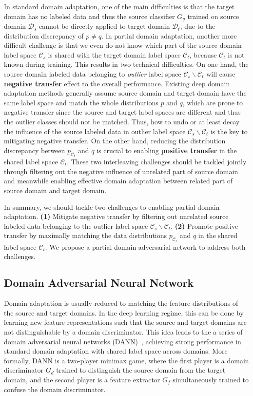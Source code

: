 \documentclass[runningheads]{llncs}
\begin{document}
In standard domain adaptation, one of the main difficulties is that the target domain has no labeled data and thus the source classifier $G_y$ trained on source domain $\mathcal{D}_s$ cannot be directly applied to target domain $\mathcal{D}_t$, due to the distribution discrepancy of $p \ne q$. In partial domain adaptation, another more difficult challenge is that we even do not know which part of the source domain label space $\mathcal{C}_s$ is shared with the target domain label space $\mathcal{C}_t$, because $\mathcal{C}_t$ is not known during training. This results in two technical difficulties.
On one hand, the source domain labeled data belonging to \emph{outlier} label space $\mathcal{C}_s \backslash \mathcal{C}_t$ will cause \textbf{negative transfer} effect to the overall performance. 
Existing deep domain adaptation methods \cite{cite:ICML15DAN,cite:ICML15RevGrad,cite:ICCV15SDT,cite:NIPS16RTN} generally assume source domain and target domain have the same label space and match the whole distributions $p$ and $q$, which are prone to negative transfer since the source and target label spaces are different and thus the outlier classes should not be matched.
Thus, how to undo or at least decay the influence of the source labeled data in outlier label space $\mathcal{C}_s \backslash \mathcal{C}_t$ is the key to mitigating negative transfer.
On the other hand, reducing the distribution discrepancy between $p_{\mathcal{C}_t}$ and $q$ is crucial to enabling \textbf{positive transfer} in the shared label space $\mathcal{C}_t$.
These two interleaving challenges should be tackled jointly through filtering out the negative influence of unrelated part of source domain and meanwhile enabling effective domain adaptation between related part of source domain and target domain.

In summary, we should tackle two challenges to enabling partial domain adaptation. \textbf{(1)} Mitigate negative transfer by filtering out unrelated source labeled data belonging to the outlier label space $\mathcal{C}_s \backslash \mathcal{C}_t$. \textbf{(2)} Promote positive transfer by maximally matching the data distributions $p_{\mathcal{C}_t}$ and $q$ in the shared label space $\mathcal{C}_t$. We propose a partial domain adversarial network to address both challenges.

\subsection{Domain Adversarial Neural Network}
Domain adaptation is usually reduced to matching the feature distributions of the source and target domains. In the deep learning regime, this can be done by learning new feature representations such that the source and target domains are not distinguishable by a domain discriminator. This idea leads to the a series of domain adversarial neural networks (DANN)~\cite{cite:ICML15RevGrad,cite:ICCV15SDT}, achieving strong performance in standard domain adaptation with shared label space across domains. More formally, DANN is a two-player minimax game, where the first player is a domain discriminator $G_d$ trained to distinguish the source domain from the target domain, and the second player is a feature extractor $G_f$ simultaneously trained to confuse the domain discriminator.
\end{document}
